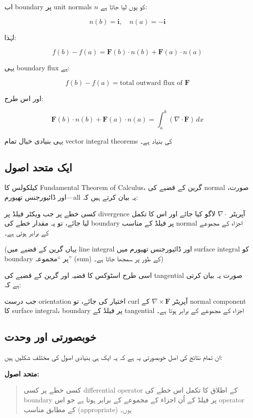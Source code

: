 \begin{enumerate}
اب boundary پر unit normals \( n \) کو یوں لیا جاتا ہے:

\[
n(b)=\mathbf{i}, \quad n(a)=-\mathbf{i}
\]

لہٰذا:

\[
f(b)-f(a)
=
\mathbf{F}(b)\cdot n(b) + \mathbf{F}(a)\cdot n(a)
\]

یہی boundary flux ہے:

\[
f(b)-f(a)
=
\text{total outward flux of } \mathbf{F}
\]

اور اس طرح:

\[
\mathbf{F}(b)\cdot n(b) + \mathbf{F}(a)\cdot n(a)
=
\int_a^b (\nabla \cdot \mathbf{F})\, dx
\]

یہی بنیادی خیال تمام vector integral theorems کی بنیاد ہے۔


\subsection*{ایک متحد اصول}

کیلکولس کا Fundamental Theorem of Calculus، گرین کے قضیے کی normal صورت، اور ڈائیورجنس تھیورم—all یہ بیان کرتے ہیں کہ:

کسی خطے پر جب ویکٹر فیلڈ پر divergence آپریٹر \( \nabla \cdot \) لاگو کیا جائے اور اس کا تکمل لیا جائے، تو یہ مقدار خطے کی boundary پر فیلڈ کے مناسب normal اجزاء کے مجموعے کے برابر ہوتی ہے۔

(یہاں گرین کے قضیے میں line integral اور ڈائیورجنس تھیورم میں surface integral کو boundary پر “مجموعہ” (sum) کے طور پر سمجھا جاتا ہے۔)

\bigskip

اسی طرح اسٹوکس کا قضیہ اور گرین کے قضیے کی tangential صورت یہ بیان کرتی ہے کہ:

جب درست orientation اختیار کی جائے، تو curl آپریٹر \( \nabla \times \mathbf{F} \) کے normal component کا surface integral، boundary پر فیلڈ کے tangential اجزاء کے مجموعے کے برابر ہوتا ہے۔

\bigskip

\subsection*{خوبصورتی اور وحدت}

ان تمام نتائج کی اصل خوبصورتی یہ ہے کہ یہ ایک ہی بنیادی اصول کی مختلف شکلیں ہیں:

\bigskip

\textbf{متحد اصول:}

\begin{quote}
کسی خطے پر کسی differential operator کے اطلاق کا تکمل اس خطے کی boundary پر فیلڈ کے اُن اجزاء کے مجموعے کے برابر ہوتا ہے جو اس operator کے مطابق مناسب (appropriate) ہوں۔
\end{quote}


\end{enumerate}
